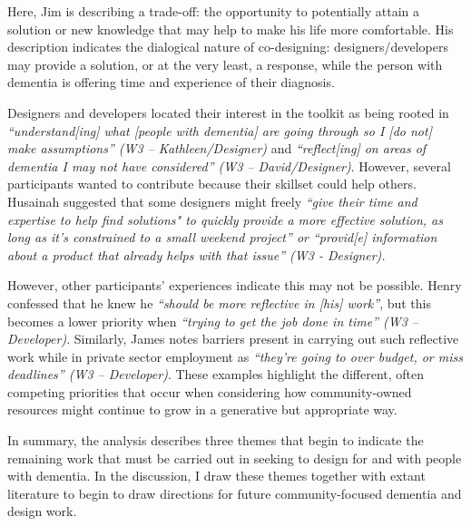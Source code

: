 Here, Jim is describing a trade-off: the opportunity to potentially attain a solution or new knowledge that may help to make his life more comfortable. His description indicates the dialogical nature of co-designing: designers/developers may provide a solution, or at the very least, a response, while the person with dementia is offering time and experience of their diagnosis. 

Designers and developers located their interest in the toolkit as being rooted in \textit{``understand[ing] what [people with dementia] are going through so I [do not] make assumptions'' (W3 – Kathleen/Designer)} and \textit{``reflect[ing] on areas of dementia I may not have considered'' (W3 – David/Designer)}. However, several participants wanted to contribute because their skillset could help others. Husainah suggested that some designers might freely \textit{``give their time and expertise to help find solutions" to quickly provide a more effective solution, as long as it’s constrained to a small weekend project'' or ``provid[e] information about a product that already helps with that issue'' (W3 - Designer).}

However, other participants’ experiences indicate this may not be possible. Henry confessed that he knew he \textit{``should be more reflective in [his] work''}, but this becomes a lower priority when \textit{``trying to get the job done in time'' (W3 – Developer)}. Similarly, James notes barriers present in carrying out such reflective work while in private sector employment as \textit{``they're going to over budget, or miss deadlines'' (W3 – Developer)}. These examples highlight the different, often competing priorities that occur when considering how community-owned resources might continue to grow in a generative but appropriate way.

In summary, the analysis describes three themes that begin to indicate the remaining work that must be carried out in seeking to design for and with people with dementia. In the discussion, I draw these themes together with extant literature to begin to draw directions for future community-focused dementia and design work.
